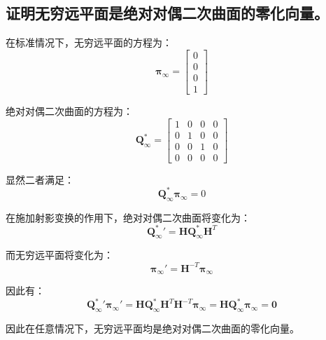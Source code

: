 \documentclass[11pt]{article}
\begin{document}
\subsection{证明无穷远平面是绝对对偶二次曲面的零化向量。}
在标准情况下，无穷远平面的方程为：
\begin{equation*}
  \mathbold{\pi}_\infty=\begin{bmatrix}
    0 \\0\\0\\1
  \end{bmatrix}
\end{equation*}\par
绝对对偶二次曲面的方程为：
\begin{equation*}
  \mathbold{Q}^*_\infty=\begin{bmatrix}
    1 & 0 & 0 & 0 \\
    0 & 1 & 0 & 0 \\
    0 & 0 & 1 & 0 \\
    0 & 0 & 0 & 0
  \end{bmatrix}
\end{equation*}\par
显然二者满足：
\begin{equation*}
  \mathbold{Q}^*_\infty\mathbold{\pi}_\infty=0
\end{equation*}\par
在施加射影变换的作用下，绝对对偶二次曲面将变化为：
\begin{equation*}
  {\mathbold{Q}^*_\infty}'=\mathbold{H}\mathbold{Q}^*_\infty\mathbold{H}^T
\end{equation*}\par
而无穷远平面将变化为：
\begin{equation*}
  \mathbold{\pi}_\infty'=\mathbold{H}^{-T}\mathbold{\pi}_\infty
\end{equation*}\par
因此有：
\begin{equation*}
  {\mathbold{Q}^*_\infty}'{\mathbold{\pi}_\infty}'=\mathbold{H}\mathbold{Q}^*_\infty\mathbold{H}^T\mathbold{H}^{-T}\mathbold{\pi}_\infty=\mathbold{H}\mathbold{Q}^*_\infty\mathbold{\pi}_\infty=\mathbold{0}
\end{equation*}\par
因此在任意情况下，无穷远平面均是绝对对偶二次曲面的零化向量。
\end{document}
